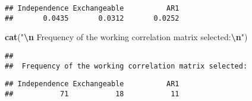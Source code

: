 \documentclass[
]{article}
\newenvironment{Shaded}{\begin{snugshade}}{\end{snugshade}}
\newcommand{\FunctionTok}[1]{\textcolor[rgb]{0.13,0.29,0.53}{\textbf{#1}}}
\newcommand{\NormalTok}[1]{#1}
\newcommand{\SpecialCharTok}[1]{\textcolor[rgb]{0.81,0.36,0.00}{\textbf{#1}}}
\newcommand{\StringTok}[1]{\textcolor[rgb]{0.31,0.60,0.02}{#1}}
\begin{document}
\begin{verbatim}
## Independence Exchangeable          AR1 
##       0.0435       0.0312       0.0252
\end{verbatim}

\begin{Shaded}
\begin{Highlighting}[]
\FunctionTok{cat}\NormalTok{(}\StringTok{"}\SpecialCharTok{\textbackslash{}n}\StringTok{ Frequency of the working correlation matrix selected:}\SpecialCharTok{\textbackslash{}n}\StringTok{"}\NormalTok{)}
\end{Highlighting}
\end{Shaded}

\begin{verbatim}
## 
##  Frequency of the working correlation matrix selected:
\end{verbatim}

\begin{Shaded}
\end{Shaded}

\begin{verbatim}
## Independence Exchangeable          AR1 
##           71           18           11
\end{verbatim}
\end{document}
